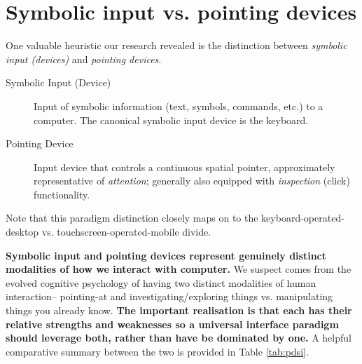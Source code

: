 \documentclass[logo,bsc,singlespacing,parskip]{infthesis}
\begin{document}
\section{Symbolic input vs. pointing devices}
\label{sec:org17ee184}
One valuable heuristic our research revealed is the distinction between \emph{symbolic input (devices)} and \emph{pointing devices}.

\begin{mdframed}
\begin{description}
\item[{Symbolic Input (Device)\label{symbolic input}}] Input of symbolic information (text, symbols, commands, etc.) to a computer.
The canonical symbolic input device is the keyboard.
\end{description}
\end{mdframed}

\begin{mdframed}
\begin{description}
\item[{Pointing Device\label{pointing device}}] Input device that controls a continuous spatial pointer, approximately representative of \emph{attention}; generally also equipped with \emph{inspection} (click) functionality.
\end{description}
\end{mdframed}

Note that this paradigm distinction closely maps on to the keyboard-operated-desktop vs. touchscreen-operated-mobile divide.

\textbf{Symbolic input and pointing devices represent genuinely distinct modalities of how we interact with computer.}
We suspect comes from the evolved cognitive psychology of having two distinct modalities of human interaction-- pointing-at and investigating/exploring things vs. manipulating things you already know.
\textbf{The important realisation is that each has their relative strengths and weaknesses so a universal interface paradigm should leverage both, rather than have be dominated by one.}
A helpful comparative summary between the two is provided in Table \ref{tab:pdsi}.
\end{document}
